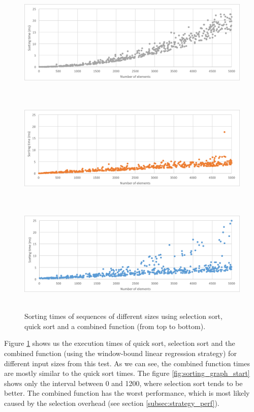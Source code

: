 \begin{figure}[h!]
	\captionsetup{justification=centering,margin=0.5cm}
	\centerline{
		\mbox{
			\includegraphics[width=130mm]{./img/sort_all_select.png}
		}
	}
	\centerline{
		\mbox{
			\includegraphics[width=130mm]{./img/sort_all_quick.png}
		}
	}
	\centerline{
		\mbox{
			\includegraphics[width=130mm]{./img/sort_all_combined.png}
		}
	}
	\caption{Sorting times of sequences of different sizes using selection sort, quick sort and a combined function (from top to bottom).}
	\label{fig:sorting_graph_all}
\end{figure}

Figure \ref{fig:sorting_graph_all} shows us the execution times of quick sort, selection sort and the combined function (using the window-bound linear regression strategy) for different input sizes from this test. As we can see, the combined function times are mostly similar to the quick sort times. The figure \ref{fig:sorting_graph_start} shows only the interval between 0 and 1200, where selection sort tends to be better. The combined function has the worst performance, which is most likely caused by the selection overhead (see section \ref{subsec:strategy_perf}).


